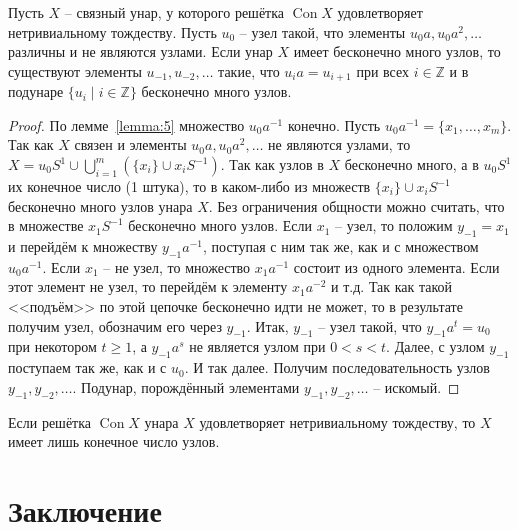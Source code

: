 \documentclass[11pt,twoside,draft
]{article}
\def\Con{\operatorname{Con}}
\begin{document}
\begin{lemma} \label{lemma:6}
	Пусть $X$ -- связный унар, у которого решётка $\Con X$ удовлетворяет нетривиальному тождеству.
	Пусть $u_0$ -- узел такой, что элементы $u_0 a, u_0 a^2, \ldots$ различны и не являются узлами.
	Если унар $X$ имеет бесконечно много узлов, то существуют элементы $u_{-1}, u_{-2}, \ldots$ такие, что $u_i a = u_{i + 1}$ при всех $i \in \mathbb{Z}$ и в подунаре $\{ u_i \mid i \in \mathbb{Z} \}$ бесконечно много узлов.
\end{lemma}
\begin{proof}
	По лемме~\ref{lemma:5} множество $u_0 a^{-1}$ конечно.
	Пусть $u_0 a^{-1} = \{ x_1, \ldots, x_m \}$.
	Так как $X$ связен и элементы $u_0 a, u_0 a^2, \ldots$ не являются узлами, то $X = u_0 S^1 \cup \bigcup_{i=1}^m (\{ x_i \} \cup x_i S^{-1})$.
	Так как узлов в $X$ бесконечно много, а в $u_0 S^1$ их конечное число (1 штука), то в каком-либо из множеств $\{ x_i \} \cup x_i S^{-1}$ бесконечно много узлов унара $X$.
	Без ограничения общности можно считать, что в множестве $x_1 S^{-1}$ бесконечно много узлов.
	Если $x_1$ -- узел, то положим $y_{-1} = x_1$ и перейдём к множеству $y_{-1} a^{-1}$, поступая с ним так же, как и с множеством $u_0 a^{-1}$.
	Если $x_1$ -- не узел, то множество $x_1 a^{-1}$ состоит из одного элемента.
	Если этот элемент не узел, то перейдём к элементу $x_1 a^{-2}$ и т.д.
	Так как такой <<подъём>> по этой цепочке бесконечно идти не может, то в результате получим узел, обозначим его через $y_{-1}$.
	Итак, $y_{-1}$ -- узел такой, что $y_{-1} a^t = u_0$ при некотором $t \geqslant 1$, а $y_{-1} a^s$ не является узлом при $0 < s < t$.
	Далее, с узлом $y_{-1}$ поступаем так же, как и с $u_0$.
	И так далее.
	Получим последовательность узлов $y_{-1}, y_{-2}, \ldots$.
	Подунар, порождённый элементами $y_{-1}, y_{-2}, \ldots$ -- искомый.
\end{proof}

\begin{lemma} \label{lemma:7}
	Если решётка $\Con X$ унара $X$ удовлетворяет нетривиальному тождеству, то $X$ имеет лишь конечное число узлов.
\end{lemma}




\section{Заключение}
\end{document}

